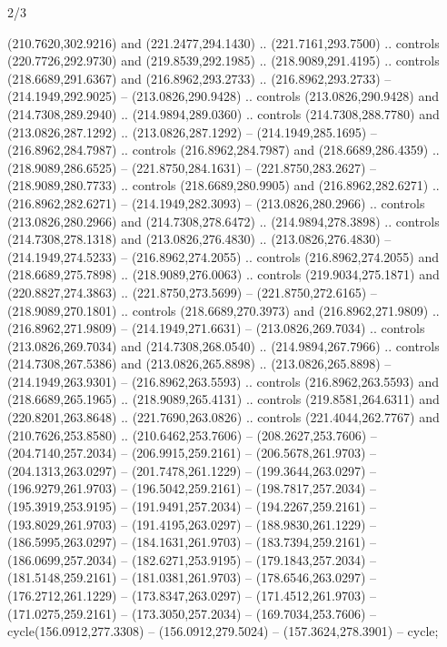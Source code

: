 \begin{flagdescription}{2/3}
\begin{scope}
\begin{scope}[xshift=0.45\flagwidth*\stretchfactor]
\begin{scope}[xshift=-0.45\flagwidth,yshift=\flagwidth,scale=0.0016667\flagwidth]
\begin{scope}[y=1pt, x=1pt, yscale=-1]
  (210.7620,302.9216) and (221.2477,294.1430) .. (221.7161,293.7500) .. controls
  (220.7726,292.9730) and (219.8539,292.1985) .. (218.9089,291.4195) .. controls
  (218.6689,291.6367) and (216.8962,293.2733) .. (216.8962,293.2733) --
  (214.1949,292.9025) -- (213.0826,290.9428) .. controls (213.0826,290.9428) and
  (214.7308,289.2940) .. (214.9894,289.0360) .. controls (214.7308,288.7780) and
  (213.0826,287.1292) .. (213.0826,287.1292) -- (214.1949,285.1695) --
  (216.8962,284.7987) .. controls (216.8962,284.7987) and (218.6689,286.4359) ..
  (218.9089,286.6525) -- (221.8750,284.1631) -- (221.8750,283.2627) --
  (218.9089,280.7733) .. controls (218.6689,280.9905) and (216.8962,282.6271) ..
  (216.8962,282.6271) -- (214.1949,282.3093) -- (213.0826,280.2966) .. controls
  (213.0826,280.2966) and (214.7308,278.6472) .. (214.9894,278.3898) .. controls
  (214.7308,278.1318) and (213.0826,276.4830) .. (213.0826,276.4830) --
  (214.1949,274.5233) -- (216.8962,274.2055) .. controls (216.8962,274.2055) and
  (218.6689,275.7898) .. (218.9089,276.0063) .. controls (219.9034,275.1871) and
  (220.8827,274.3863) .. (221.8750,273.5699) -- (221.8750,272.6165) --
  (218.9089,270.1801) .. controls (218.6689,270.3973) and (216.8962,271.9809) ..
  (216.8962,271.9809) -- (214.1949,271.6631) -- (213.0826,269.7034) .. controls
  (213.0826,269.7034) and (214.7308,268.0540) .. (214.9894,267.7966) .. controls
  (214.7308,267.5386) and (213.0826,265.8898) .. (213.0826,265.8898) --
  (214.1949,263.9301) -- (216.8962,263.5593) .. controls (216.8962,263.5593) and
  (218.6689,265.1965) .. (218.9089,265.4131) .. controls (219.8581,264.6311) and
  (220.8201,263.8648) .. (221.7690,263.0826) .. controls (221.4044,262.7767) and
  (210.7626,253.8580) .. (210.6462,253.7606) -- (208.2627,253.7606) --
  (204.7140,257.2034) -- (206.9915,259.2161) -- (206.5678,261.9703) --
  (204.1313,263.0297) -- (201.7478,261.1229) -- (199.3644,263.0297) --
  (196.9279,261.9703) -- (196.5042,259.2161) -- (198.7817,257.2034) --
  (195.3919,253.9195) -- (191.9491,257.2034) -- (194.2267,259.2161) --
  (193.8029,261.9703) -- (191.4195,263.0297) -- (188.9830,261.1229) --
  (186.5995,263.0297) -- (184.1631,261.9703) -- (183.7394,259.2161) --
  (186.0699,257.2034) -- (182.6271,253.9195) -- (179.1843,257.2034) --
  (181.5148,259.2161) -- (181.0381,261.9703) -- (178.6546,263.0297) --
  (176.2712,261.1229) -- (173.8347,263.0297) -- (171.4512,261.9703) --
  (171.0275,259.2161) -- (173.3050,257.2034) -- (169.7034,253.7606) --
  cycle(156.0912,277.3308) -- (156.0912,279.5024) -- (157.3624,278.3901) --
  cycle;
\begin{scope}[fill=white]

\end{scope}
\end{scope}
\end{scope}
\end{scope}
\end{scope}
\end{flagdescription}
